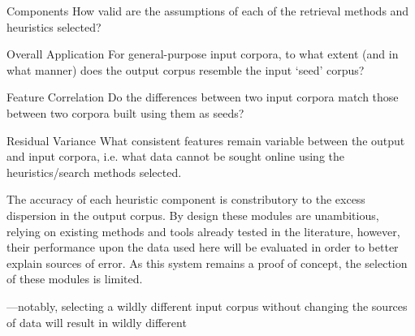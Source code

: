\begin{itemizeTitle}

    \item[Components] How valid are the assumptions of each of the retrieval methods and heuristics selected?

    \item[Overall Application] For general-purpose input corpora, to what extent (and in what manner) does the output corpus resemble the input `seed' corpus?

    \item[Feature Correlation] Do the differences between two input corpora match those between two corpora built using them as seeds?

    \item[Residual Variance] What consistent features remain variable between the output and input corpora, i.e. what data cannot be sought online using the heuristics/search methods selected.

\end{itemizeTitle}

The accuracy of each heuristic component is constributory to the excess dispersion in the output corpus.  By design these modules are unambitious, relying on existing methods and tools already tested in the literature, however, their performance upon the data used here will be evaluated in order to better explain sources of error.  As this system remains a proof of concept, the selection of these modules is limited.







---notably, selecting a wildly different input corpus without changing the sources of data will result in wildly different 




